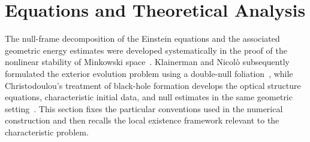 \section{Equations and Theoretical Analysis}\label{sec:theory}
The null-frame decomposition of the Einstein equations and the associated
geometric energy estimates were developed systematically in the proof of the
nonlinear stability of Minkowski space~\cite{christodoulou-klainerman-93}.
Klainerman and Nicol\`o subsequently formulated the exterior evolution problem
using a double-null foliation~\cite{klainerman-nicolo-03}, while
Christodoulou's treatment of black-hole formation develops the optical
structure equations, characteristic initial data, and null estimates in the
same geometric setting~\cite{christodoulou-09}.  This section fixes the
particular conventions used in the numerical construction and then recalls
the local existence framework relevant to the characteristic problem.
